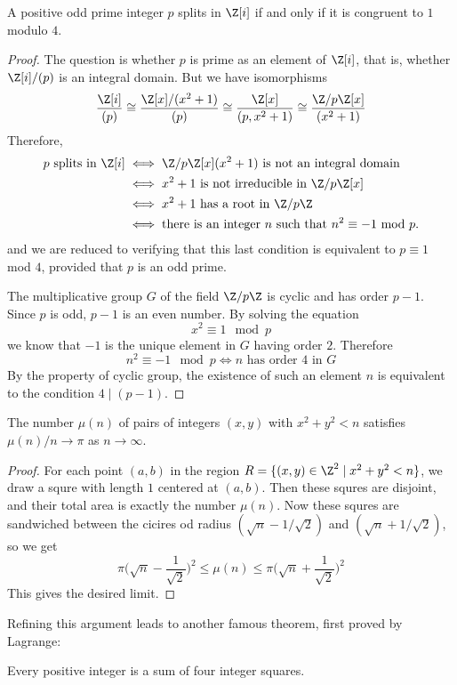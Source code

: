 \begin{lemma}
A positive odd prime integer $p$ splits in $\Z[i]$ if and only if it is congruent to $1$ modulo $4$.
\end{lemma}
\begin{proof}
The question is whether $p$ is prime as an element of $\Z[i]$, that is, whether
$\Z[i]/(p)$ is an integral domain. But we have isomorphisms
\[\frac{\Z[i]}{(p)}\cong\frac{\Z[x]/(x^2+1)}{(p)}\cong\frac{\Z[x]}{(p,x^2+1)}\cong\frac{\Z/p\Z[x]}{(x^2+1)}\]
Therefore,
\begin{align*}
\text{$p$ splits in $\Z[i]$}&\iff\text{$\Z/p\Z[x](x^2+1)$ is not an integral domain}\\
&\iff\text{$x^2+1$ is not irreducible in $\Z/p\Z[x]$}\\
&\iff\text{$x^2+1$ has a root in $\Z/p\Z$}\\
&\iff\text{there is an integer $n$ such that $n^2\equiv-1$ mod $p$}.
\end{align*}
and we are reduced to verifying that this last condition is equivalent to $p\equiv1$ mod $4$, provided that $p$ is an odd prime.\par
The multiplicative group $G$ of the field $\Z/p\Z$ is cyclic and has order $p-1$. Since $p$ is odd, $p-1$ is an even number. By solving the equation
\[x^2\equiv 1\mod p\]
we know that $-1$ is the unique element in $G$ having order $2$. Therefore
\[n^2\equiv-1\mod p\iff \text{$n$ has order $4$ in $G$}\]
By the property of cyclic group, the existence of such an element $n$ is equivalent to the condition $4\mid(p-1)$.
\end{proof}
\begin{proposition}
The number $\mu(n)$ of pairs of integers $(x,y)$ with $x^2+y^2<n$ satisfies $\mu(n)/n\to\pi$ as $n\to\infty$.
\end{proposition}
\begin{proof}
For each point $(a,b)$ in the region $R=\{(x,y)\in\Z^2\mid x^2+y^2<n\}$, we draw a squre with length $1$ centered at $(a,b)$. Then these squres are disjoint, and their total area is exactly the number $\mu(n)$. Now these squres are sandwiched between the cicires od radius $(\sqrt{n}-1/\sqrt{2})$ and $(\sqrt{n}+1/\sqrt{2})$, so we get
\[\pi\Big(\sqrt{n}-\frac{1}{\sqrt{2}}\Big)^2\leq\mu(n)\leq\pi\Big(\sqrt{n}+\frac{1}{\sqrt{2}}\Big)^2\]
This gives the desired limit.
\end{proof}
Refining this argument leads to another famous theorem, first proved by Lagrange:
\begin{theorem}
Every positive integer is a sum of four integer squares.
\end{theorem}
